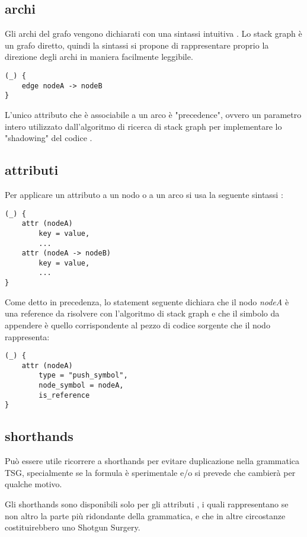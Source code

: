 \subsection{archi}

Gli archi del grafo vengono dichiarati con una sintassi intuitiva \cite{TreeSitterGraphReferenceEdges}.
Lo stack graph \`e un grafo diretto, quindi la sintassi si propone di rappresentare proprio la direzione degli archi in maniera facilmente leggibile.

\begin{lstlisting}
(_) {
    edge nodeA -> nodeB
}
\end{lstlisting}

L'unico attributo che \`e associabile a un arco \`e "precedence", ovvero un parametro intero utilizzato dall'algoritmo di ricerca di stack graph per implementare lo "shadowing" del codice \cite{TreeSitterStackGraphEdges}.

\subsection{attributi}

Per applicare un attributo a un nodo o a un arco si usa la seguente sintassi \cite{TreeSitterGraphReferenceAttributes}:

\begin{lstlisting}
(_) {
    attr (nodeA)
        key = value,
        ...
    attr (nodeA -> nodeB)
        key = value,
        ...
}
\end{lstlisting}

Come detto in precedenza, lo statement seguente dichiara che il nodo \emph{nodeA} \`e una reference da risolvere con l'algoritmo di stack graph e che il simbolo da appendere \`e quello corrispondente al pezzo di codice sorgente che il nodo rappresenta:

\begin{lstlisting}
(_) {
    attr (nodeA)
        type = "push_symbol",
        node_symbol = nodeA,
        is_reference
}
\end{lstlisting}

\subsection{shorthands}
Pu\`o essere utile ricorrere a shorthands per evitare duplicazione nella grammatica TSG, specialmente se la formula \`e sperimentale e/o si prevede che cambier\`a per qualche motivo.

Gli shorthands sono disponibili solo per gli attributi \cite{TreeSitterGraphReferenceAttributeShorthands}, i quali rappresentano se non altro la parte pi\`u ridondante della grammatica, e che in altre circostanze costituirebbero uno Shotgun Surgery.

